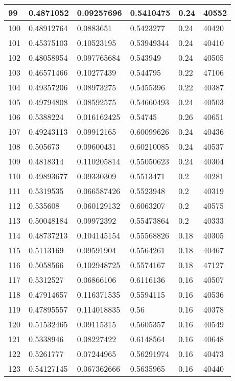 \begin{longtable}{|l|l|l|l|l|l|}
99 & 0.4871052 & 0.09257696 & 0.5410475 & 0.24 & 40552 \\ \hline 
100 & 0.48912764 & 0.0883651 & 0.5423277 & 0.24 & 40420 \\ \hline 
101 & 0.45375103 & 0.10523195 & 0.53949344 & 0.24 & 40410 \\ \hline 
102 & 0.48058954 & 0.097765684 & 0.543949 & 0.24 & 40505 \\ \hline 
103 & 0.46571466 & 0.10277439 & 0.544795 & 0.22 & 47106 \\ \hline 
104 & 0.49357206 & 0.08973275 & 0.5455396 & 0.22 & 40387 \\ \hline 
105 & 0.49794808 & 0.08592575 & 0.54660493 & 0.24 & 40503 \\ \hline 
106 & 0.5388224 & 0.016162425 & 0.54745 & 0.26 & 40651 \\ \hline 
107 & 0.49243113 & 0.09912165 & 0.60099626 & 0.24 & 40436 \\ \hline 
108 & 0.505673 & 0.09600431 & 0.60210085 & 0.24 & 40537 \\ \hline 
109 & 0.4818314 & 0.110205814 & 0.55050623 & 0.24 & 40304 \\ \hline 
110 & 0.49893677 & 0.09330309 & 0.5513471 & 0.2 & 40281 \\ \hline 
111 & 0.5319535 & 0.066587426 & 0.5523948 & 0.2 & 40319 \\ \hline 
112 & 0.535608 & 0.060129132 & 0.6063207 & 0.2 & 40575 \\ \hline 
113 & 0.50048184 & 0.09972392 & 0.55473864 & 0.2 & 40333 \\ \hline 
114 & 0.48737213 & 0.104145154 & 0.55568826 & 0.18 & 40305 \\ \hline 
115 & 0.5113169 & 0.09591904 & 0.5564261 & 0.18 & 40467 \\ \hline 
116 & 0.5058566 & 0.102948725 & 0.5574167 & 0.18 & 47127 \\ \hline 
117 & 0.5312527 & 0.06866106 & 0.6116136 & 0.16 & 40507 \\ \hline 
118 & 0.47914657 & 0.116371535 & 0.5594115 & 0.16 & 40536 \\ \hline 
119 & 0.47895557 & 0.114018835 & 0.56 & 0.16 & 40378 \\ \hline 
120 & 0.51532465 & 0.09115315 & 0.5605357 & 0.16 & 40549 \\ \hline 
121 & 0.5338946 & 0.08227422 & 0.6148564 & 0.16 & 40648 \\ \hline 
122 & 0.5261777 & 0.07244965 & 0.56291974 & 0.16 & 40473 \\ \hline 
123 & 0.54127145 & 0.067362666 & 0.5635965 & 0.16 & 40440 \\ \hline 

\end{longtable}
